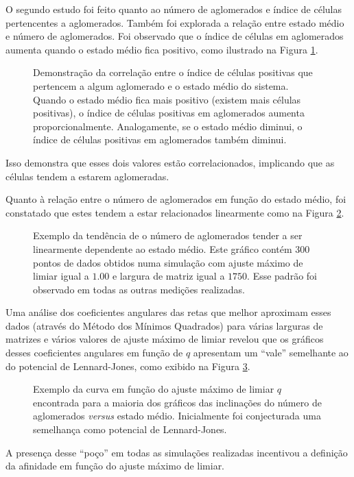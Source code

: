 \documentclass[
	12pt,				%
	openright,			%
	twoside,			%
	a4paper,			%
	english,			%
	french,				%
	spanish,			%
	brazil				%
	]{abntex2}
\begin{document}
O segundo estudo foi feito quanto ao número de aglomerados e índice de células pertencentes a aglomerados. Também foi explorada a relação entre estado médio e número de aglomerados. Foi observado que o índice de células em aglomerados aumenta quando o estado médio fica positivo, como ilustrado na Figura \ref{fig:dataL2000Q100CellInClusterAvgStateVsCycle}. 
\begin{figure}[h]
    \centering
    \caption{Demonstração da correlação entre o índice de células positivas que pertencem a algum aglomerado e o estado médio do sistema. Quando o estado médio fica mais positivo (existem mais células positivas), o índice de células positivas em aglomerados aumenta proporcionalmente. Analogamente, se o estado médio diminui, o índice de células positivas em aglomerados também diminui.}
    \label{fig:dataL2000Q100CellInClusterAvgStateVsCycle}
\end{figure}
Isso demonstra que esses dois valores estão correlacionados, implicando que as células tendem a estarem aglomeradas. 

Quanto à relação entre o número de aglomerados em função do estado médio, foi constatado que estes tendem a estar relacionados linearmente como na Figura \ref{fig:dataL1750Q100ClustersVsAvgState}. 
\begin{figure}[h]
    \centering
    \caption{Exemplo da tendência de o número de aglomerados tender a ser linearmente dependente ao estado médio. Este gráfico contém 300 pontos de dados obtidos numa simulação com ajuste máximo de limiar igual a $1.00$ e largura de matriz igual a $1750$. Esse padrão foi observado em todas as outras medições realizadas.}
    \label{fig:dataL1750Q100ClustersVsAvgState}
\end{figure}
Uma análise dos coeficientes angulares das retas que melhor aproximam esses dados (através do Método dos Mínimos Quadrados) para várias larguras de matrizes e vários valores de ajuste máximo de limiar revelou que os gráficos desses coeficientes angulares em função de $q$ apresentam um ``vale'' semelhante ao do potencial de Lennard-Jones, como exibido na Figura \ref{fig:DadosSlopeL1000}.
\begin{figure}
    \centering
    \caption{Exemplo da curva  em função do ajuste máximo de limiar $q$ encontrada para a maioria dos gráficos das inclinações do número de aglomerados \textit{versus} estado médio. Inicialmente foi conjecturada uma semelhança como potencial de Lennard-Jones.}
    \label{fig:DadosSlopeL1000}
\end{figure}
A presença desse ``poço'' em todas as simulações realizadas incentivou a definição da afinidade em função do ajuste máximo de limiar.
\end{document}
